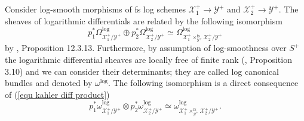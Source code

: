 \documentclass{amsart}%
\numberwithin{equation}{subsection}
\theoremstyle{plain2}
\theoremstyle{definition2}
\theoremstyle{stepstyle}
\theoremstyle{point}
\theoremstyle{subpoint}
\newcommand{\cX}{\ensuremath{\mathscr{X}}}
\newcommand{\caO}{\ensuremath{\mathcal{O}}}
\newcommand{\cY}{\ensuremath{\mathscr{Y}}}
\newcommand{\cZ}{\ensuremath{\mathscr{Z}}}
\renewcommand{\cZ}{\ensuremath{\mathscr{Z}}}
\renewcommand{\cY}{\ensuremath{\mathscr{Y}}}
\begin{document}
{%

Consider log-smooth morphisms of fs log schemes $\cX_1^+ \rightarrow \cY^+$ and $\cX_2^+ \rightarrow \cY^+$. The sheaves of logarithmic differentials are related by the following isomorphism \begin{equation} \label{equ kahler diff product}
p_1^* \Omega^{\log}_{\cX_1^+/\cY^+} \oplus p_2^* \Omega^{\log}_{\cX_2^+/ \cY^+} \simeq \Omega^{\log}_{\cX_1^+\times^{\text{fs}}_{\cY^+} \cX_2^+ /\cY^+}\end{equation} by \cite{GabberRamero}, Proposition 12.3.13. Furthermore, by assumption of log-smoothness over $S^+$ the logarithmic differential sheaves are locally free of finite rank (\cite{Kato1994a}, Proposition 3.10) and we can consider their determinants; they are called log canonical bundles and denoted by $\omega^{\log}$. The following isomorphism is a direct consequence of (\ref{equ kahler diff product}) \begin{equation} \label{equ log can bundles}
p_1^* \omega^{\log}_{\cX_1^+/\cY^+} \otimes p_2^* \omega^{\log}_{\cX_2^+/ \cY^+} \simeq \omega^{\log}_{\cX_1^+\times^{\text{fs}}_{\cY^+} \cX_2^+ /\cY^+}.\end{equation} }
\end{document}

